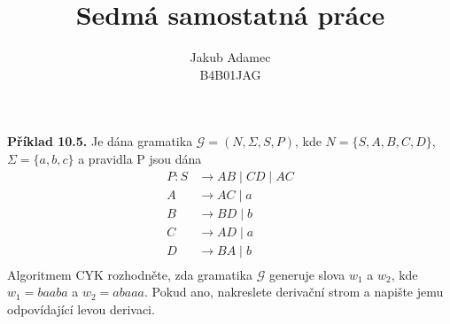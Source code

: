 \documentclass[11pt]{article}
\begin{document}

\newcommand\splitpage[2]{
      \begin{minipage}[t]{0.45\textwidth}#1
      \end{minipage}%
      \hfill
      \begin{minipage}[t]{0.45\textwidth}#2
      \end{minipage}
}
 
 
\title{\textbf{Sedmá samostatná práce}}
\author{Jakub Adamec\\ %
B4B01JAG} %

\maketitle

\noindent
\textbf{Příklad 10.5.} Je dána gramatika $\mathcal{G} = (N, \Sigma, S, P)$, kde $N = \{S, A, B, C, D\}$, $\Sigma = \{a,b,c\}$ a pravidla P jsou dána
\begin{align*}
    P:    S & \rightarrow AB \mid CD \mid AC \\
          A & \rightarrow AC \mid a \\
          B & \rightarrow BD \mid b \\ 
          C & \rightarrow AD \mid a \\
          D & \rightarrow BA \mid b \\
\end{align*}
Algoritmem CYK rozhodněte, zda gramatika $\mathcal{G}$ generuje slova $w_1$ a $w_2$, kde ${w_1 = baaba}$ a ${w_2 = abaaa}$. Pokud ano, nakreslete derivační strom a napište jemu odpovídající levou derivaci.


 
\end{document}
